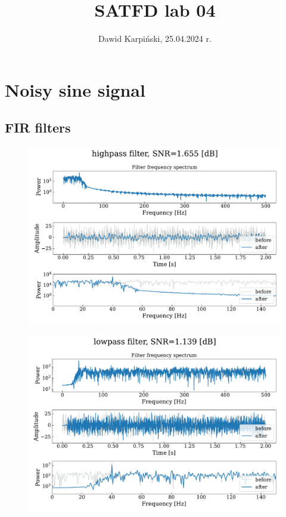\documentclass[13pt,a4paper]{article}
\begin{document}
\title{
    \LARGE
    \textbf{SATFD lab 04}
}
\author{
    \large
    Dawid Karpiński, 25.04.2024 r.
}
\date{}
\maketitle

\section{Noisy sine signal}
\subsection{FIR filters}

\begin{figure}[ht!]
    \centering
    \includegraphics[width=0.9\linewidth]{fir.highpass.pdf}
\end{figure}
\pagebreak

\begin{figure}[ht!]
    \centering
    \includegraphics[width=0.9\linewidth]{fir.lowpass.pdf}
\end{figure}
\end{document}
